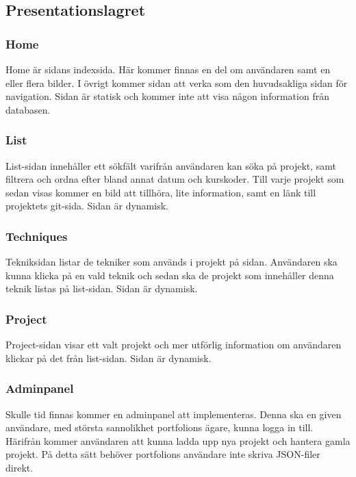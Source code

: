 \documentclass{TDP003mall}
\begin{document}
\subsection{Presentationslagret} 

\subsubsection{Home}
Home är sidans indexsida. Här kommer finnas en del om användaren samt en eller flera bilder.
I övrigt kommer sidan att verka som den huvudsakliga sidan för navigation. Sidan är 
statisk och kommer inte att visa någon information från databasen.

\subsubsection{List}
List-sidan innehåller ett sökfält varifrån användaren kan söka på projekt, samt filtrera
och ordna efter bland annat datum och kurskoder. Till varje projekt som sedan 
visas kommer en bild att tillhöra, lite information, samt en länk till projektets git-sida.
Sidan är dynamisk.

\subsubsection{Techniques}
Tekniksidan listar de tekniker som används i projekt på sidan. Användaren ska kunna
klicka på en vald teknik och sedan ska de projekt som innehåller denna teknik listas
på list-sidan. Sidan är dynamisk.

\subsubsection{Project}
Project-sidan visar ett valt projekt och mer utförlig information om användaren
klickar på det från list-sidan. Sidan är dynamisk.

\subsubsection{Adminpanel}
Skulle tid finnas kommer en adminpanel att implementeras. Denna ska en given användare,
med största sannolikhet portfolions ägare, kunna logga in till. Härifrån kommer
användaren att kunna ladda upp nya projekt och hantera gamla projekt. På detta
sätt behöver portfolions användare inte skriva JSON-filer direkt. 
\end{document}
